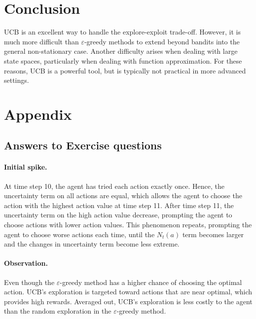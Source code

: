 \documentclass{article}
\begin{document}
\section{Conclusion}
UCB is an excellent way to handle the explore-exploit trade-off. However, it is much more difficult than $\varepsilon$-greedy methods to extend beyond bandits into the general non-stationary case. Another difficulty arises when dealing with large state spaces, particularly when dealing with function approximation. For these reasons, UCB is a powerful tool, but is typically not practical in more advanced settings.

\section{Appendix}
\subsection{Answers to Exercise questions}
\paragraph{Initial spike.} At time step 10, the agent has tried each action exactly once. Hence, the uncertainty term on all actions are equal, which allows the agent to choose the action with the highest action value at time step 11. After time step 11, the uncertainty term on the high action value decrease, prompting the agent to choose actions with lower action values. This phenomenon repeats, prompting the agent to choose worse actions each time, until the $N_t(a)$ term becomes larger and the changes in uncertainty term become less extreme.  
\paragraph{Observation. } Even though the $\varepsilon$-greedy method has a higher chance of choosing the optimal action. UCB's exploration is targeted toward actions that are near optimal, which provides high rewards. Averaged out, UCB's exploration is less costly to the agent than the random exploration in the $\varepsilon$-greedy method.
\end{document}
